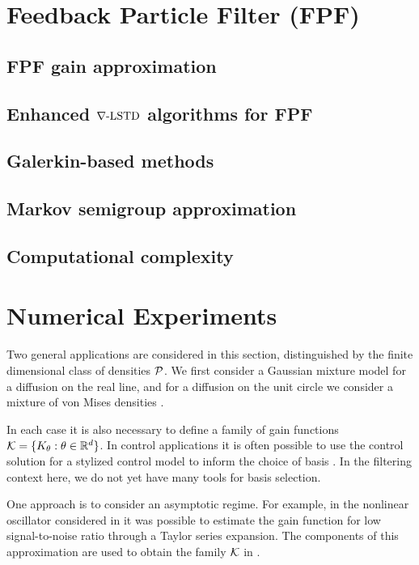 \section{Feedback Particle Filter (FPF)}
\label{s:fpf}
\subsection{FPF gain approximation}
\subsection{Enhanced $\nabla\text{-LSTD}$ algorithms for FPF} 
\subsection{Galerkin-based methods}
\subsection{Markov semigroup approximation}
\subsection{Computational complexity}

\section{Numerical Experiments}
\label{s:fpf_numerics}

Two general applications are considered in this section, distinguished by the finite dimensional class of densities ${\cal P}$.  We first consider a Gaussian mixture model for a diffusion on the real line,  and for a diffusion on the unit circle we consider a mixture of von Mises densities \cite{haspea00}.

In each case it is also necessary to define a family of gain functions ${\cal K} = \{K_\theta : \theta\in\mathbb{R}^d\}$.  In control applications it is often possible to use the control solution for a stylized control model to inform the choice of basis  \cite{CTCN,huachemehmeysur11}.  In the filtering context here, we do not yet have many tools for basis selection.

One approach is to consider an asymptotic regime.  For example, in the nonlinear oscillator considered in \cite{yanmehmey13} it was possible to estimate the gain function for low signal-to-noise ratio through a Taylor series expansion.  The components of this approximation are used to obtain the family ${\cal K}$ in
.

